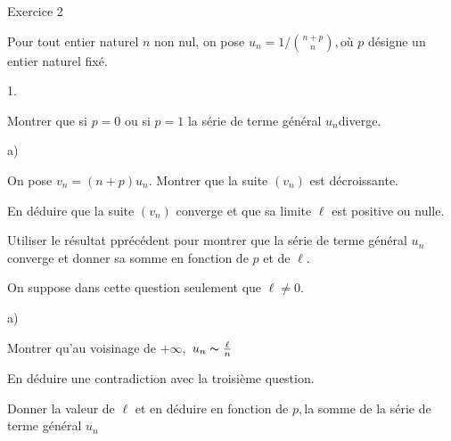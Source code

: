 \documentclass[11pt]{article}%
\begin{document}
{\Large Exercice 2}

Pour tout entier naturel $n$ non nul, on pose $u_{n} = 1/\binom{n +
p}{n},$où
$p$ désigne un entier naturel fixé.

\begin{noliste}{1.}
 \setlength{\itemsep}{4mm}
\item {Montrer que si $p = 0$ ou si $p = 1$ la série de terme général
$u_{n}$diverge. }


\item 
\begin{noliste}{a)}
 \setlength{\itemsep}{2mm}
\item {Montrer que $\forall n\in \N,\left( n + p + 2\right)
u_{n + 2} = \left( n + 2\right) u_{n + 1}$. }

\item {En déduire par récurrence sur $n$ que }$ =
{\frac{1}{p-1}}$}$\left( {1-\left( n + p + 1\right) u_{n + 1}}\right)
${\ 
}
\end{noliste}

\item 
\begin{noliste}{a)}
 \setlength{\itemsep}{2mm}
\item {On pose $v_{n} = (n + p)u_{n}$. Montrer que la suite $(v_{n})$
est décroissante. }

\item {En déduire que la suite $(v_{n})$ converge et que sa limite
$\ell 
$ est positive ou nulle. }

\item {Utiliser le résultat pprécédent pour montrer que la série de
terme général $u_{n}$converge et donner sa somme en fonction
de $p$ et de $\ell $. }
\end{noliste}

\item On suppose dans cette question seulement que $\ell \neq 0$.

\begin{noliste}{a)}
 \setlength{\itemsep}{2mm}
\item {Montrer qu'au voisinage de }$ + \infty,\;${$u_{n}\thicksim 
\frac{\ell }{n}$}

\item {En déduire une contradiction avec la troisième question. }
\end{noliste}

\item {Donner la valeur de $\ell $ et en déduire en fonction de $p,$la
somme de la série de terme général $u_{n}$ }
\end{noliste}
\end{document}
